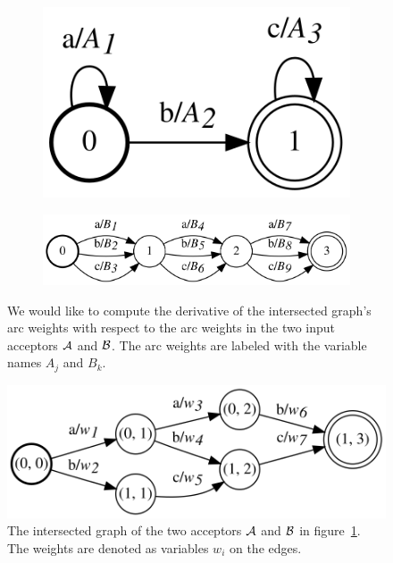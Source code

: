 \begin{figure}
    \centering
    \begin{subfigure}[b]{0.3\textwidth}
        \centering
        \includegraphics[scale=\dotscale]{figures/intersect_grad_1}
    \end{subfigure}
    \begin{subfigure}[b]{0.68\textwidth}
        \centering
        \includegraphics[scale=\dotscale]{figures/intersect_grad_2}
    \end{subfigure}
    \caption{We would like to compute the derivative of the intersected graph's
    arc weights with respect to the arc weights in the two input acceptors
    $\mathcal{A}$ and $\mathcal{B}$. The arc weights are labeled with the variable names $A_j$
    and $B_k$.}
    \label{fig:intersect_grad_inputs}
\end{figure}

\begin{figure}
    \centering
    \includegraphics[scale=\dotscale]{figures/intersect_grad}
    \caption{The intersected graph of the two acceptors $\mathcal{A}$ and $\mathcal{B}$ in
    figure~\ref{fig:intersect_grad_inputs}.  The weights are denoted as
    variables $w_i$ on the edges.}
    \label{fig:intersect_grad}
\end{figure}

